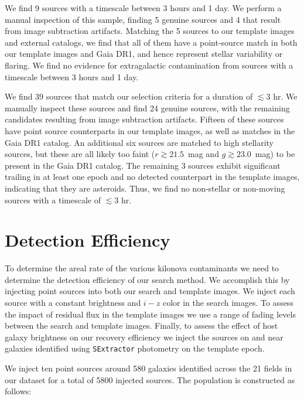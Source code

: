 \clearpage
We find 9 sources with a timescale between 3 hours and 1 day. We perform a manual inspection of this sample, finding 5 genuine sources and 4 that result from image subtraction artifacts. Matching the 5 sources to our template images and external catalogs, we find that all of them have a point-source match in both our template images and Gaia DR1, and hence represent stellar variability or flaring. We find no evidence for extragalactic contamination from sources with a timescale between 3 hours and 1 day.

We find 39 sources that match our selection criteria for a duration of $\lesssim 3$ hr. We manually inspect these sources and find 24 genuine sources, with the remaining candidates resulting from image subtraction artifacts. Fifteen of these sources have point source counterparts in our template images, as well as matches in the Gaia DR1 catalog. An additional six sources are matched to high stellarity sources, but these are all likely too faint ($r \gtrsim 21.5$~mag and $g \gtrsim 23.0$~mag) to be present in the Gaia DR1 catalog. The remaining 3 sources exhibit significant trailing in at least one epoch and no detected counterpart in the template images, indicating that they are asteroids. Thus, we find no non-stellar or non-moving sources with a timescale of $\lesssim 3$ hr.

\section{Detection Efficiency}
\label{sec:ch3_fakes}
To determine the areal rate of the various kilonova contaminants we need to determine the detection efficiency of our search method. We accomplish this by injecting point sources into both our search and template images. We inject each source with a constant brightness and $i-z$ color in the search images. To assess the impact of residual flux in the template images we use a range of fading levels between the search and template images.  Finally, to assess the effect of host galaxy brightness on our recovery efficiency we inject the sources on and near galaxies identified using {\tt SExtractor} photometry on the template epoch.

We inject ten point sources around 580 galaxies identified across the 21 fields in our dataset for a total of 5800 injected sources. The population is constructed as follows:

